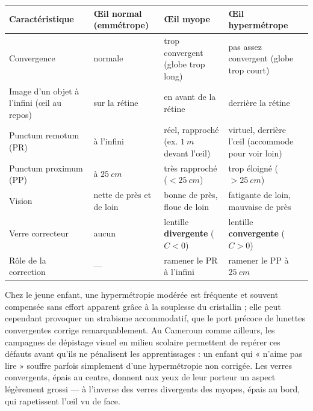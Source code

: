 \documentclass[11pt]{article}
\begin{document}
\begin{center}
\begin{tabularx}{\linewidth}{|l|X|X|X|}
\hline
\rowcolor{popblueL} \textbf{Caractéristique} & \textbf{Œil normal (emmétrope)} & \textbf{Œil myope} & \textbf{Œil hypermétrope} \\
\hline
Convergence & normale & trop convergent (globe trop long) & pas assez convergent (globe trop court) \\
\hline
Image d'un objet à l'infini (œil au repos) & sur la rétine & en avant de la rétine & derrière la rétine \\
\hline
Punctum remotum (PR) & à l'infini & réel, rapproché (ex. $\SI{1}{m}$ devant l'œil) & virtuel, derrière l'œil (accommode pour voir loin) \\
\hline
Punctum proximum (PP) & à $\SI{25}{cm}$ & très rapproché ($< \SI{25}{cm}$) & trop éloigné ($> \SI{25}{cm}$) \\
\hline
Vision & nette de près et de loin & bonne de près, floue de loin & fatigante de loin, mauvaise de près \\
\hline
Verre correcteur & aucun & lentille \textbf{divergente} ($C < 0$) & lentille \textbf{convergente} ($C > 0$) \\
\hline
Rôle de la correction & --- & ramener le PR à l'infini & ramener le PP à $\SI{25}{cm}$ \\
\hline
\end{tabularx}
\end{center}

\begin{savaistu}
Chez le jeune enfant, une hypermétropie modérée est fréquente et souvent compensée sans effort apparent grâce à la souplesse du cristallin ; elle peut cependant provoquer un strabisme accommodatif, que le port précoce de lunettes convergentes corrige remarquablement. Au Cameroun comme ailleurs, les campagnes de dépistage visuel en milieu scolaire permettent de repérer ces défauts avant qu'ils ne pénalisent les apprentissages : un enfant qui « n'aime pas lire » souffre parfois simplement d'une hypermétropie non corrigée. Les verres convergents, épais au centre, donnent aux yeux de leur porteur un aspect légèrement grossi — à l'inverse des verres divergents des myopes, épais au bord, qui rapetissent l'œil vu de face.
\end{savaistu}
\end{document}
